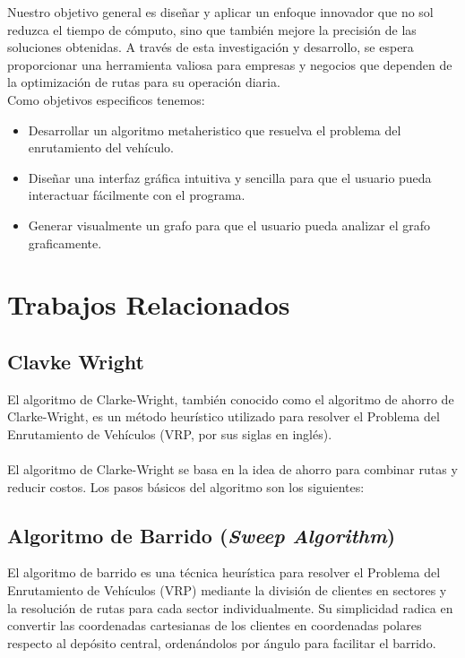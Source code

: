 \documentclass[10pt,twocolumn,letterpaper]{article}
\begin{document}
Nuestro objetivo general es diseñar y aplicar un enfoque innovador que no sol reduzca el tiempo de cómputo, sino que también mejore la precisión de las soluciones obtenidas. A través de esta investigación y desarrollo, se espera proporcionar una herramienta valiosa para empresas y negocios que dependen de la optimización de rutas para su operación diaria.\\

Como objetivos especificos tenemos:

\begin{itemize}
	\item Desarrollar un algoritmo metaheristico que resuelva el problema del enrutamiento del vehículo.

	\item Diseñar una interfaz gráfica intuitiva y sencilla para que el usuario pueda interactuar fácilmente con el programa.

	\item Generar visualmente un grafo para que el usuario pueda analizar el grafo graficamente.
\end{itemize}

\section{Trabajos Relacionados}
\subsection{Clavke Wright}
El algoritmo de Clarke-Wright, también conocido como el algoritmo de ahorro de Clarke-Wright, es un método heurístico utilizado para resolver el Problema del Enrutamiento de Vehículos (VRP, por sus siglas en inglés).\\
\\
El algoritmo de Clarke-Wright se basa en la idea de ahorro para combinar rutas y reducir costos. Los pasos básicos del algoritmo son los siguientes:

\subsection{Algoritmo de Barrido (\textit{Sweep Algorithm})}
El algoritmo de barrido es una técnica heurística para resolver el Problema del Enrutamiento de Vehículos (VRP) mediante la división de clientes en sectores y la resolución de rutas para cada sector individualmente. Su simplicidad radica en convertir las coordenadas cartesianas de los clientes en coordenadas polares respecto al depósito central, ordenándolos por ángulo para facilitar el barrido.\\
\end{document}
